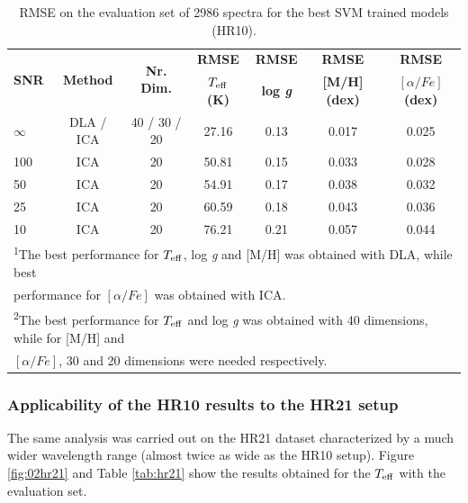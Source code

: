 \documentclass[a4paper,fleqn,usenatbib]{mnras}
\begin{document}
{{{\begin{table}
\centering
\caption{RMSE on the evaluation set of 2986 spectra for the best SVM trained models (HR10).}
\label{tab:01}
\begin{tabular}{l c c c c c c}
\hline
\multirow{2}{*}{\textbf{SNR}} & \multirow{2}{*}{\textbf{Method}} & \multirow{2}{*}{\textbf{Nr. Dim.}} & {\bf RMSE} & {\bf RMSE} & {\bf RMSE} & {\bf RMSE}\\
 &  &  & \textbf{$T_{\rm eff}$ (K)} & \textbf{log \textit{g}} & \textbf{[M/H] (dex)}  & \textbf{$\left[ \alpha/Fe \right]$ (dex)}\\
\hline
$\infty$ & DLA / ICA\protect\footnotemark[1] & 40 / 30 / 20\protect\footnotemark[2] & 27.16 & 0.13 & 0.017 & 0.025\\
100 & ICA & 20 & 50.81 & 0.15 & 0.033 & 0.028\\
50 & ICA & 20 & 54.91 & 0.17 & 0.038 & 0.032\\
25 & ICA & 20 & 60.59 & 0.18 & 0.043 & 0.036\\
10 & ICA & 20 & 76.21 & 0.21 & 0.057 & 0.044\\
\hline
\multicolumn{7}{l}{\textsuperscript{1}\footnotesize{The best performance for $T_{\rm eff}$, log 
		\textit{g} and [M/H] was obtained with DLA,  while best}}\\
\multicolumn{7}{l}{\footnotesize{performance for $\left[ \alpha/Fe \right]$ was obtained with ICA.}}\\
\multicolumn{7}{l}{\textsuperscript{2}\footnotesize{The best performance for $T_{\rm eff}$ and log 
		\textit{g} was obtained with 40 dimensions, while for [M/H] and}}\\ 
		\multicolumn{7}{l}{\footnotesize{ 
		$\left[ \alpha/Fe \right]$, 30 and 20 dimensions were needed respectively.}}
\end{tabular}
\end{table}

\subsubsection{Applicability of the HR10 results to the HR21 setup}

The same analysis was carried out on the HR21 dataset characterized by  
a much wider wavelength range (almost twice as wide as the HR10 setup).
Figure \ref{fig:02hr21} and Table \ref{tab:hr21} show the results 
obtained for the $T_{\rm eff}$ with the evaluation set.

}}}
\end{document}
